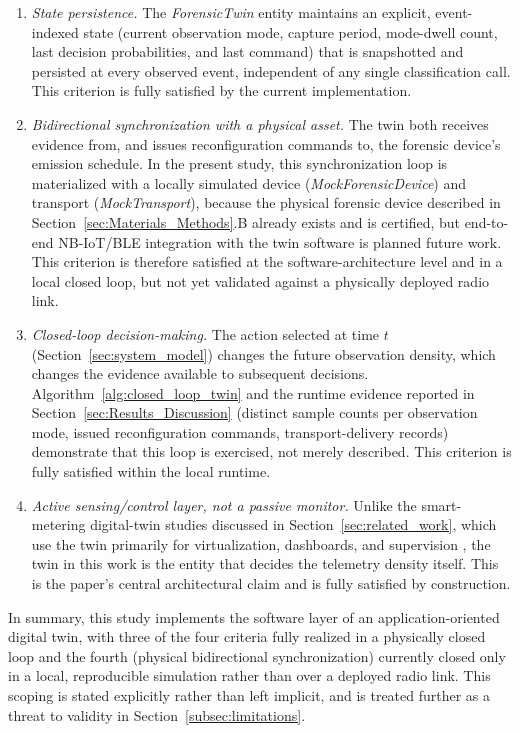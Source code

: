 \documentclass{ieeeaccess}
\begin{document}
\begin{enumerate}
    \item \textit{State persistence.} The \textit{ForensicTwin} entity maintains an explicit, event-indexed state (current observation mode, capture period, mode-dwell count, last decision probabilities, and last command) that is snapshotted and persisted at every observed event, independent of any single classification call. This criterion is fully satisfied by the current implementation.
    \item \textit{Bidirectional synchronization with a physical asset.} The twin both receives evidence from, and issues reconfiguration commands to, the forensic device's emission schedule. In the present study, this synchronization loop is materialized with a locally simulated device (\textit{MockForensicDevice}) and transport (\textit{MockTransport}), because the physical forensic device described in Section~\ref{sec:Materials_Methods}.B already exists and is certified, but end-to-end NB-IoT/BLE integration with the twin software is planned future work. This criterion is therefore satisfied at the software-architecture level and in a local closed loop, but not yet validated against a physically deployed radio link.
    \item \textit{Closed-loop decision-making.} The action selected at time $t$ (Section~\ref{sec:system_model}) changes the future observation density, which changes the evidence available to subsequent decisions. Algorithm~\ref{alg:closed_loop_twin} and the runtime evidence reported in Section~\ref{sec:Results_Discussion} (distinct sample counts per observation mode, issued reconfiguration commands, transport-delivery records) demonstrate that this loop is exercised, not merely described. This criterion is fully satisfied within the local runtime.
    \item \textit{Active sensing/control layer, not a passive monitor.} Unlike the smart-metering digital-twin studies discussed in Section~\ref{sec:related_work}, which use the twin primarily for virtualization, dashboards, and supervision \cite{b18,b19,b20,b22}, the twin in this work is the entity that decides the telemetry density itself. This is the paper's central architectural claim and is fully satisfied by construction.
\end{enumerate}

In summary, this study implements the software layer of an application-oriented digital twin, with three of the four criteria fully realized in a physically closed loop and the fourth (physical bidirectional synchronization) currently closed only in a local, reproducible simulation rather than over a deployed radio link. This scoping is stated explicitly rather than left implicit, and is treated further as a threat to validity in Section~\ref{subsec:limitations}.
\end{document}
